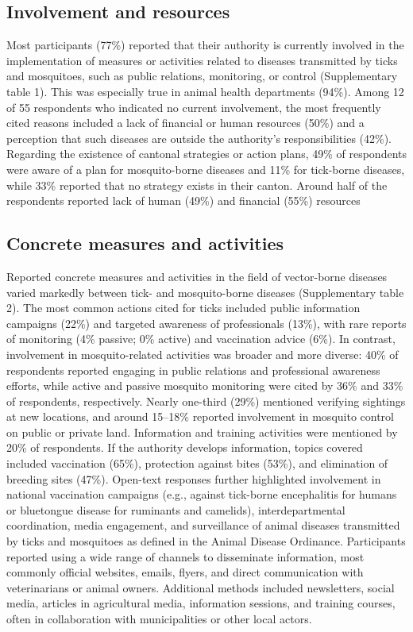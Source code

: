 \documentclass[
  11pt,
]{article}
\begin{document}
\subsection{Involvement and resources}\label{involvement-and-resources}

Most participants (77\%) reported that their authority is currently
involved in the implementation of measures or activities related to
diseases transmitted by ticks and mosquitoes, such as public relations,
monitoring, or control (Supplementary table 1). This was especially true
in animal health departments (94\%). Among 12 of 55 respondents who
indicated no current involvement, the most frequently cited reasons
included a lack of financial or human resources (50\%) and a perception
that such diseases are outside the authority's responsibilities (42\%).
Regarding the existence of cantonal strategies or action plans, 49\% of
respondents were aware of a plan for mosquito-borne diseases and 11\%
for tick-borne diseases, while 33\% reported that no strategy exists in
their canton. Around half of the respondents reported lack of human
(49\%) and financial (55\%) resources

\subsection{Concrete measures and
activities}\label{concrete-measures-and-activities}

Reported concrete measures and activities in the field of vector-borne
diseases varied markedly between tick- and mosquito-borne diseases
(Supplementary table 2). The most common actions cited for ticks
included public information campaigns (22\%) and targeted awareness of
professionals (13\%), with rare reports of monitoring (4\% passive; 0\%
active) and vaccination advice (6\%). In contrast, involvement in
mosquito-related activities was broader and more diverse: 40\% of
respondents reported engaging in public relations and professional
awareness efforts, while active and passive mosquito monitoring were
cited by 36\% and 33\% of respondents, respectively. Nearly one-third
(29\%) mentioned verifying sightings at new locations, and around
15--18\% reported involvement in mosquito control on public or private
land. Information and training activities were mentioned by 20\% of
respondents. If the authority develops information, topics covered
included vaccination (65\%), protection against bites (53\%), and
elimination of breeding sites (47\%). Open-text responses further
highlighted involvement in national vaccination campaigns (e.g., against
tick-borne encephalitis for humans or bluetongue disease for ruminants
and camelids), interdepartmental coordination, media engagement, and
surveillance of animal diseases transmitted by ticks and mosquitoes as
defined in the Animal Disease Ordinance. Participants reported using a
wide range of channels to disseminate information, most commonly
official websites, emails, flyers, and direct communication with
veterinarians or animal owners. Additional methods included newsletters,
social media, articles in agricultural media, information sessions, and
training courses, often in collaboration with municipalities or other
local actors.
\end{document}
